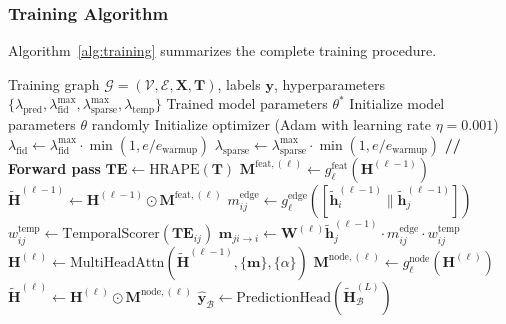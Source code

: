 \subsubsection{Training Algorithm}

Algorithm~\ref{alg:training} summarizes the complete training procedure.

\begin{algorithm}[ht!]
\caption{RTXGNN Training Procedure}
\label{alg:training}
\begin{algorithmic}[1]
\REQUIRE Training graph $\mathcal{G} = (\mathcal{V}, \mathcal{E}, \mathbf{X}, \mathbf{T})$, labels $\mathbf{y}$, hyperparameters $\{\lambda_{\text{pred}}, \lambda_{\text{fid}}^{\max}, \lambda_{\text{sparse}}^{\max}, \lambda_{\text{temp}}\}$
\ENSURE Trained model parameters $\theta^*$
\STATE Initialize model parameters $\theta$ randomly
\STATE Initialize optimizer (Adam with learning rate $\eta = 0.001$)
    \STATE $\lambda_{\text{fid}} \gets \lambda_{\text{fid}}^{\max} \cdot \min(1, e / e_{\text{warmup}})$
    \STATE $\lambda_{\text{sparse}} \gets \lambda_{\text{sparse}}^{\max} \cdot \min(1, e / e_{\text{warmup}})$
        \STATE \textbf{// Forward pass}
            \STATE $\mathbf{TE} \gets \text{HRAPE}(\mathbf{T})$ 
            \STATE $\mathbf{M}^{\text{feat},(\ell)} \gets g^{\text{feat}}_\ell(\mathbf{H}^{(\ell-1)})$ 
            \STATE $\tilde{\mathbf{H}}^{(\ell-1)} \gets \mathbf{H}^{(\ell-1)} \odot \mathbf{M}^{\text{feat},(\ell)}$
                \STATE $m_{ij}^{\text{edge}} \gets g^{\text{edge}}_\ell([\tilde{\mathbf{h}}^{(\ell-1)}_i \| \tilde{\mathbf{h}}^{(\ell-1)}_j])$ 
                \STATE $w_{ij}^{\text{temp}} \gets \text{TemporalScorer}(\mathbf{TE}_{ij})$ 
                \STATE $\mathbf{m}_{ji \to i} \gets \mathbf{W}^{(\ell)} \tilde{\mathbf{h}}^{(\ell-1)}_j \cdot m_{ij}^{\text{edge}} \cdot w_{ij}^{\text{temp}}$
            \ENDFOR
            \STATE $\mathbf{H}^{(\ell)} \gets \text{MultiHeadAttn}(\tilde{\mathbf{H}}^{(\ell-1)}, \{\mathbf{m}\}, \{\alpha\})$ 
            \STATE $\mathbf{M}^{\text{node},(\ell)} \gets g^{\text{node}}_\ell(\mathbf{H}^{(\ell)})$ 
            \STATE $\tilde{\mathbf{H}}^{(\ell)} \gets \mathbf{H}^{(\ell)} \odot \mathbf{M}^{\text{node},(\ell)}$
        \ENDFOR
        \STATE $\hat{\mathbf{y}}_{\mathcal{B}} \gets \text{PredictionHead}(\tilde{\mathbf{H}}^{(L)}_{\mathcal{B}})$ 

\end{algorithmic}
\end{algorithm}
